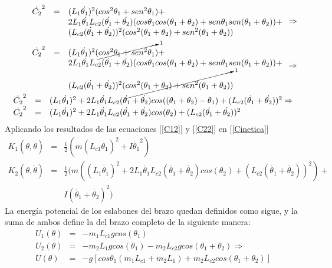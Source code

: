 \documentclass[11pt,spanish,lettersize]{article}
\begin{document}
\begin{eqnarray}
\nonumber\begin{array}{rcl}
\dot{C_2}^2&=&(L_1\dot{\theta_1})^2(cos^2\theta_1+sen^2\theta_1)+\\
&&2L_1\dot{\theta_1}L_{c2}(\dot{\theta_1}+\dot{\theta_2})(cos\theta_1cos(\theta_1+\theta_2)+sen\theta_1sen(\theta_1+\theta_2))+\\
&&(L_{c2}(\dot{\theta_1}+\dot{\theta_2}))^2(cos^2(\theta_1+\theta_2)+sen^2(\theta_1+\theta_2))
\end{array}\Rightarrow\\
\nonumber\begin{array}{rcl}
\dot{C_2}^2&=&(L_1\dot{\theta_1})^2(\cancelto{1}{cos^2\theta_1+sen^2\theta_1})+\\
&&2L_1\dot{\theta_1}L_{c2}(\dot{\theta_1}+\dot{\theta_2})(cos\theta_1cos(\theta_1+\theta_2)+sen\theta_1sen(\theta_1+\theta_2))+\\
&&(L_{c2}(\dot{\theta_1}+\dot{\theta_2}))^2(\cancelto{1}{cos^2(\theta_1+\theta_2)+sen^2(\theta_1+\theta_2)})
\end{array}\Rightarrow\\
\begin{array}{rcl}
\dot{C_2}^2&=&(L_1\dot{\theta_1})^2+2L_1\dot{\theta_1}L_{c2}(\dot{\theta_1}+\dot{\theta_2})cos((\theta_1+\theta_2)-\theta_1)+(L_{c2}(\dot{\theta_1}+\dot{\theta_2}))^2\Rightarrow\\
\dot{C_2}^2&=&(L_1\dot{\theta_1})^2+2L_1\dot{\theta_1}L_{c2}(\dot{\theta_1}+\dot{\theta_2})cos(\theta_2)+(L_{c2}(\dot{\theta_1}+\dot{\theta_2}))^2\label{C22}
\end{array}
\end{eqnarray}
Aplicando los resultados de las ecuaciones [\ref{C12}] y [\ref{C22}] en [\ref{Cinetica}]
\begin{eqnarray}
K_1(\theta,\dot{\theta})&=&\frac{1}{2}(m(L_{c1}\dot{\theta_1})^2+I\dot{\theta_1}^2)\\
\nonumber K_2(\theta,\dot{\theta})&=&\frac{1}{2}(m((L_1\dot{\theta_1})^2+2L_1\dot{\theta_1}L_{c2}(\dot{\theta_1}+\dot{\theta_2})cos(\theta_2)+(L_{c2}(\dot{\theta_1}+\dot{\theta_2}))^2)+\\
&&I(\dot{\theta_1}+\dot{\theta_2})^2)\label{CineticaTotal}
\end{eqnarray}
La energ\'ia potencial de los eslabones del brazo quedan definidos como sigue, y la suma de ambos define la del brazo completo de la siguiente manera:
\begin{eqnarray}
U_1(\theta)&=&-m_1L_{c1}g cos(\theta_1)\\
U_2(\theta)&=&-m_2L_1g cos(\theta_1)-m_2L_{c2}g cos(\theta_1+\theta_2)\Rightarrow\\
U(\theta)&=&-g[cos\theta_1(m_1L_{c1}+m_2L_1)+m_2L_{c2}cos(\theta_1+\theta_2)]\label{PotencialTotal}
\end{eqnarray}
\end{document}
